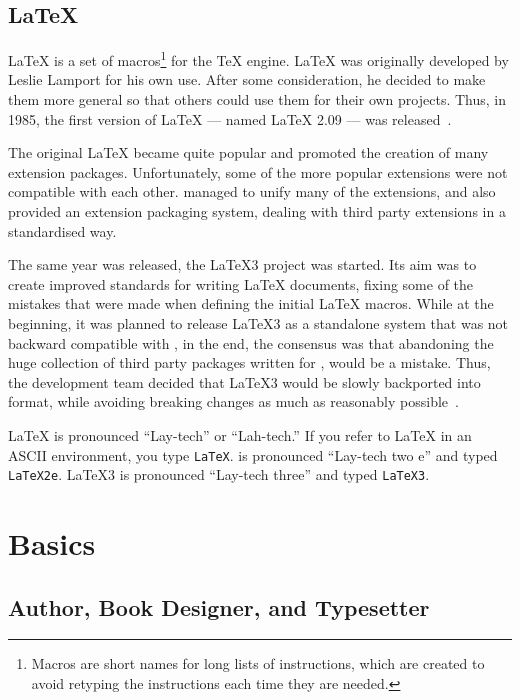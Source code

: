 \subsection{\LaTeX{}}

\LaTeX{} is a set of macros\footnote{Macros are short names for long lists of
  instructions, which are created to avoid retyping the instructions each time
  they are needed.} for the \TeX{} engine. \LaTeX{} was originally developed by
Leslie Lamport for his own use. After some
consideration, he decided to make them more general so that others could use
them for their own projects. Thus, in 1985, the first version of \LaTeX{} ---
named \LaTeX{} 2.09 --- was released~\cite{manual}.

The original \LaTeX{} became quite popular and promoted the creation of many
extension packages. Unfortunately, some of the more popular extensions were not
compatible with each other. \LaTeXe{} managed to unify many of the extensions,
and also provided an extension packaging system, dealing with third party
extensions in a standardised way.

The same year \LaTeXe{} was released, the \LaTeX3 project was started. Its aim
was to create improved standards for writing \LaTeX{} documents, fixing some of
the mistakes that were made when defining the initial \LaTeX{} macros. While at
the beginning, it was planned to release \LaTeX3 as a standalone system that was
not backward compatible with \LaTeXe{}, in the end, the consensus was that
abandoning the huge collection of third party packages written for \LaTeXe{},
would be a mistake. Thus, the development team decided that
\LaTeX3 would be slowly backported into \LaTeXe{} format, while avoiding
breaking changes as much as reasonably possible~\cite{quovadis}.

\LaTeX{} is pronounced \enquote{Lay-tech} or \enquote{Lah-tech.} If you refer
to \LaTeX{} in an ASCII environment, you type \texttt{LaTeX}. \LaTeXe{} is
pronounced \enquote{Lay-tech two e} and typed \texttt{LaTeX2e}. \LaTeX3 is
pronounced \enquote{Lay-tech three} and typed \texttt{LaTeX3}.

\section{Basics}

\subsection{Author, Book Designer, and Typesetter}

